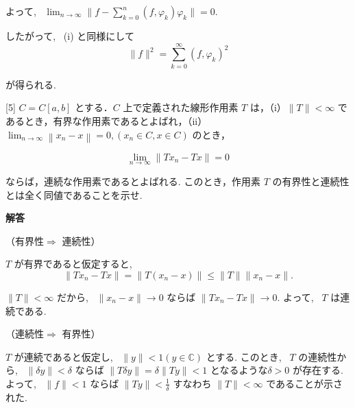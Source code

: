 \documentclass{jsarticle}
\begin{document}
よって, \ $\displaystyle\lim_{n \to \infty} \| f-\sum_{k=0}^{n}\left(f, \varphi_{k}\right) \varphi_{k} \| = 0$.

したがって, \ (i) と同様にして$$
\|f\|^{2}= \sum_{k=0}^{\infty}\left(f, \varphi_{k}\right)^{2}
$$

が得られる.\\


\bigskip
\bigskip

\begin{itembox}[l]{[5]}
$C=C[a, b]$ とする．$C$ 上で定義された線形作用素 $T$ は，（i）$\|T\|<\infty$ であるとき，有界な作用素であるとよばれ，（ii） $\lim _{n \rightarrow \infty}\left\|x_{n}-x\right\|=0,\left(x_{n} \in C, x \in C\right)$ のとき，


\begin{equation*}
\lim _{n \rightarrow \infty}\left\|T x_{n}-T x\right\|=0 \tag{11}
\end{equation*}


ならば，連続な作用素であるとよばれる. このとき，作用素 $T$ の有界性と連続性とは全く同値であることを示せ.  
\end{itembox}

\textbf{解答}

（有界性$\Longrightarrow$ 連続性）

$T$ が有界であると仮定すると, \ 
$$
\| Tx_n - Tx\| = \| T(x_n - x)\| \leq \|T\| \|x_n - x\|.
$$

$\|T\| < \infty$ だから, \ $\|x_n - x\| \to 0$ ならば $\|Tx_n - Tx\| \to 0$. よって, \ $T$ は連続である.

\bigskip

（連続性$\Longrightarrow$ 有界性）

$T$ が連続であると仮定し, \ $\|y\| < 1 (y \in \mathbb{C})$ とする. このとき, \ $T$ の連続性から, \ $\|\delta y\| < \delta$ ならば $\|T\delta y\| = \delta\|Ty\| < 1$ となるような$\delta > 0$ が存在する. よって, \ $\|f\| < 1$ ならば $\|Ty\| < \frac{1}{\delta}$ すなわち $\|T\| < \infty$ であることが示された.

\bigskip
\bigskip
\end{document}
